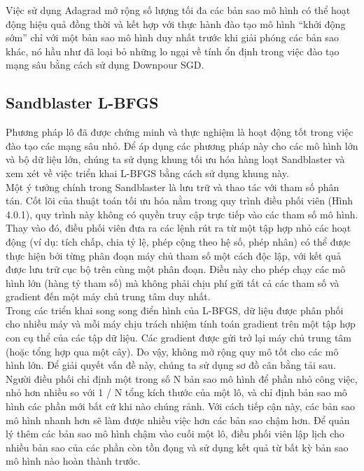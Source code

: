 \documentclass[11pt,a4paper]{article}
\numberwithin{equation}{subsection}
\numberwithin{figure}{subsection}
\numberwithin{table}{subsection}
\begin{document}
Việc sử dụng Adagrad mở rộng số lượng tối đa các bản sao mô hình có thể hoạt động hiệu quả đồng thời và kết hợp với thực hành đào tạo mô hình “khởi động sớm” chỉ với một bản sao mô hình duy nhất trước khi giải phóng các bản sao khác, nó hầu như đã loại bỏ những lo ngại về tính ổn định trong việc đào tạo mạng sâu bằng cách sử dụng Downpour SGD.

\subsection{Sandblaster L-BFGS}
Phương pháp lô đã được chứng minh và thực nghiệm là hoạt động tốt trong việc đào tạo các mạng sâu nhỏ. Để áp dụng các phương pháp này cho các mô hình lớn và bộ dữ liệu lớn, chúng ta sử dụng  khung tối ưu hóa hàng loạt Sandblaster và xem xét về việc triển khai L-BFGS bằng cách sử dụng khung này.\\

Một ý tưởng chính trong Sandblaster là lưu trữ và thao tác với tham số phân tán. Cốt lõi của thuật toán tối ưu hóa nằm trong quy trình điều phối viên (Hình 4.0.1), quy trình này không có quyền truy cập trực tiếp vào các tham số mô hình. Thay vào đó, điều phối viên đưa ra các lệnh rút ra từ một tập hợp nhỏ các hoạt động (ví dụ: tích chấp, chia tỷ lệ, phép cộng theo hệ số, phép nhân) có thể được thực hiện bởi từng phân đoạn máy chủ tham số một cách độc lập, với kết quả được lưu trữ cục bộ trên cùng một phân đoạn. Điều này cho phép chạy các mô hình lớn (hàng tỷ tham số) mà không phải chịu phí gửi tất cả các tham số và gradient đến một máy chủ trung tâm duy nhất.\\

Trong các triển khai song song điển hình của L-BFGS, dữ liệu được phân phối cho nhiều máy và mỗi máy chịu trách nhiệm tính toán gradient trên một tập hợp con cụ thể của các tập dữ liệu. Các gradient được gửi trở lại máy chủ trung tâm (hoặc tổng hợp qua một cây). 
Do vậy, không mở rộng quy mô tốt cho các mô hình lớn. Để giải quyết vấn đề này, chúng ta sử dụng sơ đồ cân bằng tải sau. Người điều phối chỉ định một trong số N bản sao mô hình để phần nhỏ công việc, nhỏ hơn nhiều so với 1 / N tổng kích thước của một lô, và chỉ định bản sao mô hình các phần mới bất cứ khi nào chúng rảnh. Với cách tiếp cận này, các bản sao mô hình nhanh hơn sẽ làm được nhiều việc hơn các bản sao chậm hơn. Để quản lý thêm các bản sao mô hình chậm vào cuối một lô, điều phối viên lập lịch cho nhiều bản sao của các phần còn tồn đọng và sử dụng kết quả từ bất kỳ bản sao mô hình nào hoàn thành trước.\\
\end{document}
